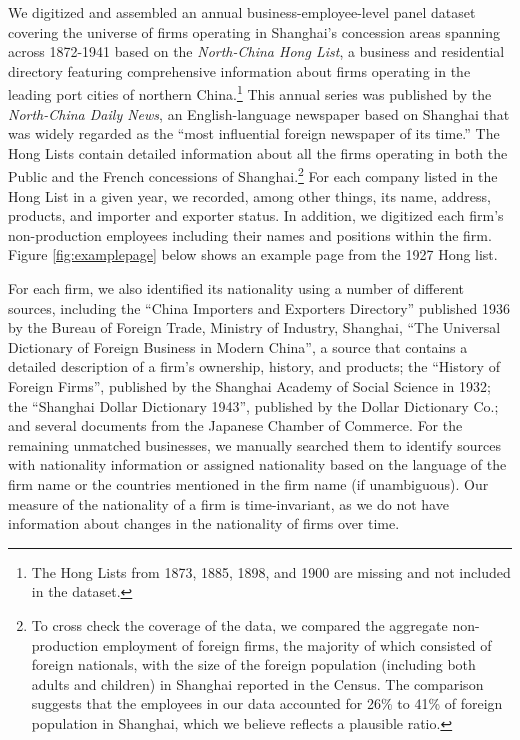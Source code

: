 \documentclass[12pt]{article}
\begin{document}
We digitized and assembled an annual business-employee-level panel dataset covering the universe of firms operating in Shanghai's concession areas spanning across 1872-1941 based on the \emph{North-China Hong List}, a business and residential directory featuring comprehensive information about firms operating in the leading port cities of northern China.\footnote{The Hong Lists from 1873, 1885, 1898, and 1900 are missing and not included in the dataset.}  This annual series was published by the \emph{North-China Daily News}, an English-language newspaper based on Shanghai that was widely regarded as the ``most influential foreign newspaper of its time.'' The Hong Lists contain detailed information about all the firms operating in both the Public and the French concessions of Shanghai.\footnote{To cross check the coverage of the data, we compared the aggregate non-production employment of foreign firms, the majority of which consisted of foreign nationals, with the size of the foreign population (including both adults and children) in Shanghai reported in the Census. The comparison suggests that the employees in our data accounted for 26\% to 41\% of foreign population in Shanghai, which we believe reflects a plausible ratio.} For each company listed in the Hong List in a given year, we recorded, among other things, its name, address, products, and importer and exporter status. In addition, we digitized each firm’s non-production employees including their names and positions within the firm. Figure \ref{fig:examplepage} below shows an example page from the 1927 Hong list.

For each firm, we also identified its nationality using a number of different sources, including the ``China Importers and Exporters Directory'' published 1936 by the Bureau of Foreign Trade, Ministry of Industry, Shanghai, ``The Universal Dictionary of Foreign Business in Modern China'', a source that contains a detailed description of a firm's ownership, history, and products; the ``History of Foreign Firms'', published by the Shanghai Academy of Social Science in 1932; the ``Shanghai Dollar Dictionary 1943'', published by the Dollar Dictionary Co.; and several documents from the Japanese Chamber of Commerce. For the remaining unmatched businesses, we manually searched them to identify sources with nationality information or assigned nationality based on the language of the firm name or the countries mentioned in the firm name (if unambiguous). Our measure of the nationality of a firm is time-invariant, as we do not have information about changes in the nationality of firms over time. 
\end{document}
